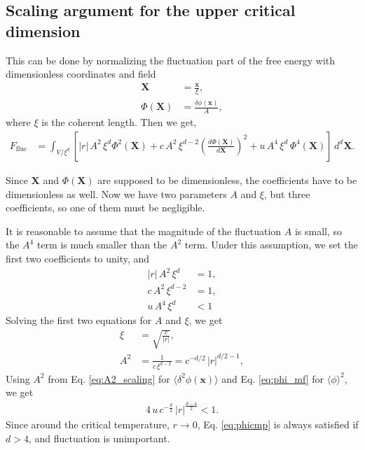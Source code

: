 \documentclass{article}
\begin{document}
\subsection{Scaling argument for the upper critical dimension}

This can be done by normalizing the fluctuation part of the free energy with dimensionless coordinates and field
\begin{align}
\mathbf X &= \frac{ \mathbf x }{ \xi }, \\
\Phi(\mathbf X) &= \frac{ \delta \phi(\mathbf x) }{A},
\end{align}
where $\xi$ is the coherent length.
%
Then we get,
$$
\begin{aligned}
F_\mathrm{fluc}
&=
\int_{V/\xi^d} \left[
|r| \, A^2\, \xi^d \Phi^2(\mathbf X)
+ c \, A^2 \, \xi^{d-2} \left(
\frac{ d \Phi(\mathbf X) }{ d \mathbf X} \right)^2
+ u \, A^4 \, \xi^d \, \Phi^4(\mathbf X)
\right] \, d^d \mathbf X.
\end{aligned}
$$

Since $\mathbf X$ and $\Phi(\mathbf X)$ are supposed to be dimensionless,
the coefficients have to be dimensionless as well.
Now we have two parameters $A$ and $\xi$,
but three coefficients, so one of them must be negligible.

It is reasonable to assume that
the magnitude of the fluctuation $A$ is small,
so the $A^4$ term is much smaller than the $A^2$ term.
Under this assumption,
we set the first two coefficients to unity, and
\begin{align}
|r| \, A^2 \, \xi^d &= 1, \\
c \, A^2 \, \xi^{d-2} &= 1, \\
u \, A^4 \, \xi^d &< 1
\label{eq:drop_uphi4}
\end{align}
Solving the first two equations for $A$ and $\xi$, we get
\begin{align}
\xi &= \sqrt{\frac{c}{|r|}},
\label{eq:xi_scaling}
\\
A^2 &= \frac{1}{c \, \xi^{d-2}} = c^{-d/2} \, |r|^{d/2-1},
\label{eq:A2_scaling}
\end{align}
Using $A^2$ from Eq. \eqref{eq:A2_scaling} for $\langle \delta^2 \phi(\mathbf x) \rangle$
and Eq. \eqref{eq:phi_mf} for $\langle \phi \rangle^2$, we get
\begin{align}
4 \, u \, c^{-\frac{d}{2}} \, |r|^{\frac{d-4}{2}} < 1.
\label{eq:upper_condition}
\end{align}
Since around the critical temperature, $r \rightarrow 0$,
Eq. \eqref{eq:phicmp} is always satisfied if $d > 4$,
and fluctuation is unimportant.
\end{document}
